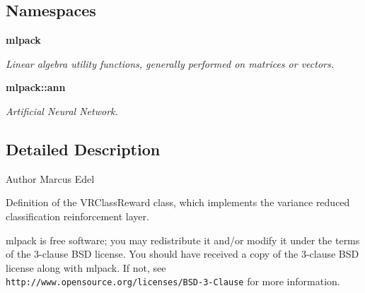 \subsection*{Namespaces}
\begin{DoxyCompactItemize}
\item 
 \textbf{ mlpack}
\begin{DoxyCompactList}\small\item\em Linear algebra utility functions, generally performed on matrices or vectors. \end{DoxyCompactList}\item 
 \textbf{ mlpack\+::ann}
\begin{DoxyCompactList}\small\item\em Artificial Neural Network. \end{DoxyCompactList}\end{DoxyCompactItemize}


\subsection{Detailed Description}
\begin{DoxyAuthor}{Author}
Marcus Edel
\end{DoxyAuthor}
Definition of the V\+R\+Class\+Reward class, which implements the variance reduced classification reinforcement layer.

mlpack is free software; you may redistribute it and/or modify it under the terms of the 3-\/clause B\+SD license. You should have received a copy of the 3-\/clause B\+SD license along with mlpack. If not, see {\tt http\+://www.\+opensource.\+org/licenses/\+B\+S\+D-\/3-\/\+Clause} for more information. 